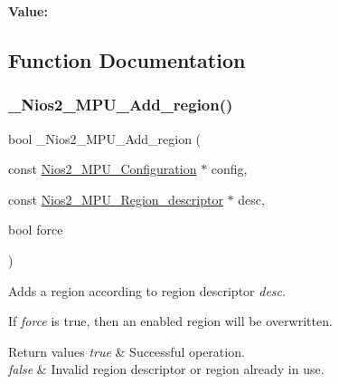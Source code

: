 {\bfseries Value\+:}
\begin{DoxyCode}{0}
\DoxyCodeLine{\{ \(\backslash\)}
\DoxyCodeLine{    \textcolor{keyword}{false}, \textcolor{keyword}{false}, \textcolor{keyword}{false}, \textcolor{keyword}{true} \(\backslash\)}
\DoxyCodeLine{  \}}

\end{DoxyCode}


\subsection{Function Documentation}
\mbox{\label{nios2-utility_8h_a68bf4897cc02ed096d6d417bf6571415}} 
\subsubsection{\texorpdfstring{\_Nios2\_MPU\_Add\_region()}{\_Nios2\_MPU\_Add\_region()}}
{\footnotesize\ttfamily bool \+\_\+\+Nios2\+\_\+\+M\+P\+U\+\_\+\+Add\+\_\+region (\begin{DoxyParamCaption}\item[{const \mbox{\hyperlink{structNios2__MPU__Configuration}{Nios2\+\_\+\+M\+P\+U\+\_\+\+Configuration}} $\ast$}]{config,  }\item[{const \mbox{\hyperlink{structNios2__MPU__Region__descriptor}{Nios2\+\_\+\+M\+P\+U\+\_\+\+Region\+\_\+descriptor}} $\ast$}]{desc,  }\item[{bool}]{force }\end{DoxyParamCaption})}



Adds a region according to region descriptor {\itshape desc}. 

If {\itshape force} is true, then an enabled region will be overwritten.


\begin{DoxyRetVals}{Return values}
{\em true} & Successful operation. \\
\hline
{\em false} & Invalid region descriptor or region already in use. \\
\hline
\end{DoxyRetVals}
\mbox{\label{nios2-utility_8h_ae6a1f7a5a81929c1fa5ef96418b1258a}} 
